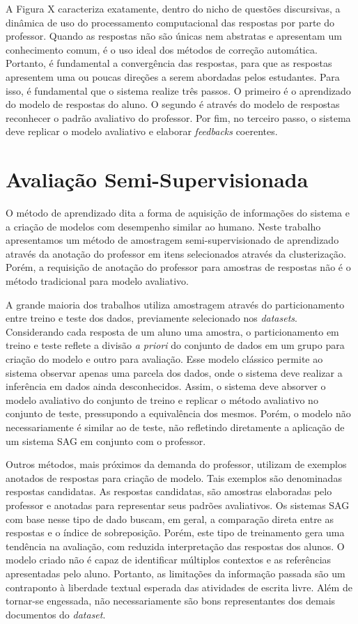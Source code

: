 A Figura X caracteriza exatamente, dentro do nicho de questões discursivas, a dinâmica de uso do processamento computacional das respostas por parte do professor. Quando as respostas não são únicas nem abstratas e apresentam um conhecimento comum, é o uso ideal dos métodos de correção automática. Portanto, é fundamental a convergência das respostas, para que as respostas apresentem uma ou poucas direções a serem abordadas pelos estudantes. Para isso, é fundamental que o sistema realize três passos. O primeiro é o aprendizado do modelo de respostas do aluno. O segundo é através do modelo de respostas reconhecer o padrão avaliativo do professor. Por fim, no terceiro passo, o sistema deve replicar o modelo avaliativo e elaborar \textit{feedbacks} coerentes.

\section{Avaliação Semi-Supervisionada}
O método de aprendizado dita a forma de aquisição de informações do sistema e a criação de modelos com desempenho similar ao humano. Neste trabalho apresentamos um método de amostragem semi-supervisionado de aprendizado através da anotação do professor em itens selecionados através da clusterização. Porém, a requisição de anotação do professor para amostras de respostas não é o método tradicional para modelo avaliativo.

A grande maioria dos trabalhos utiliza amostragem através do particionamento entre treino e teste dos dados, previamente selecionado nos \textit{datasets}. Considerando cada resposta de um aluno uma amostra, o particionamento em treino e teste reflete a divisão \textit{a priori} do conjunto de dados em um grupo para criação do modelo e outro para avaliação. Esse modelo clássico permite ao sistema observar apenas uma parcela dos dados, onde o sistema deve realizar a inferência em dados ainda desconhecidos. Assim, o sistema deve absorver o modelo avaliativo do conjunto de treino e replicar o método avaliativo no conjunto de teste, pressupondo a equivalência dos mesmos. Porém, o modelo não necessariamente é similar ao de teste, não refletindo diretamente a aplicação de um sistema SAG em conjunto com o professor.

Outros métodos, mais próximos da demanda do professor, utilizam de exemplos anotados de respostas para criação de modelo. Tais exemplos são denominadas respostas candidatas. As respostas candidatas, são amostras elaboradas pelo professor e anotadas para representar seus padrões avaliativos. Os sistemas SAG com base nesse tipo de dado buscam, em geral, a comparação direta entre as respostas e o índice de sobreposição. Porém, este tipo de treinamento gera uma tendência na avaliação, com reduzida interpretação das respostas dos alunos. O modelo criado não é capaz de identificar múltiplos contextos e as referências apresentadas pelo aluno. Portanto, as limitações da informação passada são um contraponto à liberdade textual esperada das atividades de escrita livre. Além de tornar-se engessada, não necessariamente são bons representantes dos demais documentos do \textit{dataset}.


